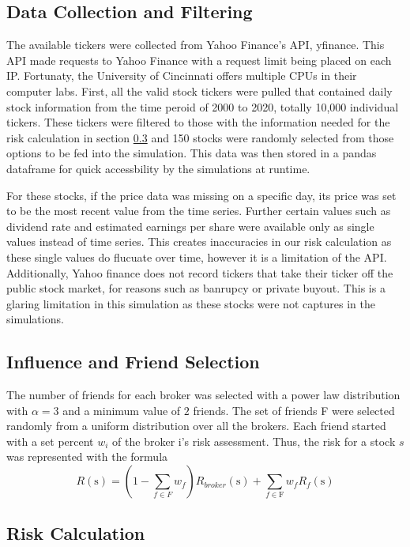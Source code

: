\documentclass[letterpaper, 10 pt, proceedings]{ieeetran}
\begin{document}
	\subsection{Data Collection and Filtering}\label{subsec:data}
	The available tickers were collected from Yahoo Finance's API, yfinance. This API made requests to Yahoo Finance with a request limit being placed on each IP. Fortunaty, the University of Cincinnati offers multiple CPUs in their computer labs. First, all the valid stock tickers were pulled that contained daily stock information from the time peroid of 2000 to 2020, totally 10,000 individual tickers. These tickers were filtered to those with the information needed for the risk calculation in section \ref{subsec:risk} and 150 stocks were randomly selected from those options to be fed into the simulation. This data was then stored in a pandas dataframe for quick accessbility by the simulations at runtime.\par
	For these stocks, if the price data was missing on a specific day, its price was set to be the most recent value from the time series. Further certain values such as dividend rate and estimated earnings per share were available only as single values instead of time series. This creates inaccuracies in our risk calculation as these single values do flucuate over time, however it is a limitation of the API. Additionally, Yahoo finance does not record tickers that take their ticker off the public stock market, for reasons such as banrupcy or private buyout. This is a glaring limitation in this simulation as these stocks were not captures in the simulations.  
	

	\subsection{Influence and Friend Selection}\label{subsec:friends}
	The number of friends for each broker was selected with a power law distribution with $\alpha = 3$ and a minimum value of $2$ friends. The set of friends F were selected randomly from a uniform distribution over all the brokers. Each friend started with a set percent $w_i$ of the broker i's risk assessment. Thus, the risk for a stock $s$ was represented with the formula 
	$$R(\text{s}) = (1-\sum\limits_{f\in F} w_f) R_{broker}(\text{s}) + \sum\limits_{f\in \text{F}} w_f R_f(\text{s})$$

	\subsection{Risk Calculation}\label{subsec:risk}
	
\end{document}
